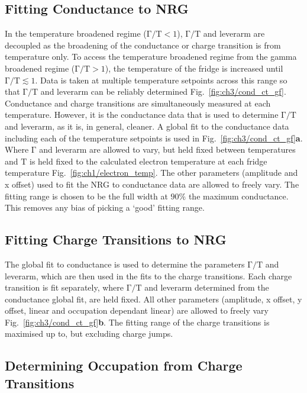 \subsection{Fitting Conductance to NRG}
In the temperature broadened regime ($\mathrm{\Gamma/T} < 1$), $\mathrm{\Gamma/T}$ and leverarm are decoupled as the broadening of the conductance or charge transition is from temperature only. To access the temperature broadened regime from the gamma broadened regime ($\mathrm{\Gamma/T} > 1$), the temperature of the fridge is increased until $\mathrm{\Gamma/T} \lesssim 1$. Data is taken at multiple temperature setpoints across this range so that $\mathrm{\Gamma/T}$ and leverarm can be reliably determined Fig.~\ref{fig:ch3/cond_ct_gf}. Conductance and charge transitions are simultaneously measured at each temperature. However, it is the conductance data that is used to determine $\mathrm{\Gamma/T}$ and leverarm, as it is, in general, cleaner. A global fit to the conductance data including each of the temperature setpoints is used in Fig.~\ref{fig:ch3/cond_ct_gf}\textbf{a}. Where $\mathrm{\Gamma}$ and leverarm are allowed to vary, but held fixed between temperatures and $\mathrm{T}$ is held fixed to the calculated electron temperature at each fridge temperature Fig.~\ref{fig:ch1/electron_temp}. The other parameters (amplitude and x offset) used to fit the NRG to conductance data are allowed to freely vary.
The fitting range is chosen to be the full width at $90\%$ the maximum conductance. This removes any bias of picking a `good' fitting range. 

\subsection{Fitting Charge Transitions to NRG}
The global fit to conductance is used to determine the parameters $\mathrm{\Gamma/T}$ and leverarm, which are then used in the fits to the charge transitions. Each charge transition is fit separately, where $\mathrm{\Gamma/T}$ and leverarm determined from the conductance global fit, are held fixed. All other parameters (amplitude, x offset, y offset, linear and occupation dependant linear) are allowed to freely vary Fig.~\ref{fig:ch3/cond_ct_gf}\textbf{b}. The fitting range of the charge transitions is maximised up to, but excluding charge jumps.


\subsection{Determining Occupation from Charge Transitions}


